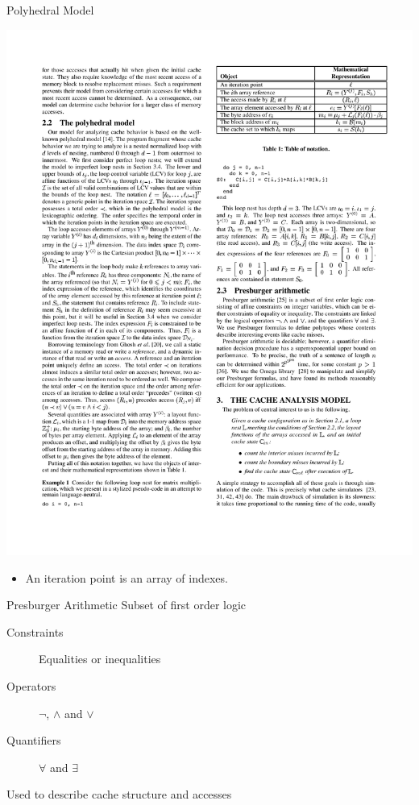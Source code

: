 \documentclass{beamer}
\begin{document}
\begin{frame}{Polyhedral Model}
  \begin{center}
    \includegraphics[trim={0 0.6cm 0 0}, clip, scale=1.1]{table1}
  \end{center}

  \begin{itemize}
    \item An iteration point is an array of indexes.
  \end{itemize}
\end{frame}

\begin{frame}{Presburger Arithmetic}
  Subset of first order logic
  \begin{description}
    \item[Constraints] Equalities or inequalities
    \item[Operators] $\neg$, $\wedge$ and $\vee$
    \item[Quantifiers] $\forall$ and $\exists$
  \end{description}
  \vfill
  Used to describe cache structure and accesses
\end{frame}
\end{document}
